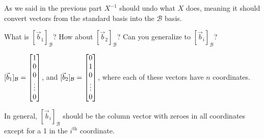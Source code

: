 \documentclass{workbook}
\begin{document}
\begin{slide}
\begin{parts}
\begin{solution}
				As we said in the previous part $X^{-1}$ should undo what $X$ does,
				meaning it should convert vectors from the standard basis into
				the $\mathcal B$ basis.
			\end{solution}
		\item What is $[\vec b_1]_{\mathcal B}$?  How about $[\vec b_2]_{\mathcal B}$?  Can
			you generalize to $[\vec b_i]_{\mathcal B}$?
			\begin{solution}
				$[\vec b_1]_{\mathcal B}=\begin{bmatrix}1\\0\\0\\\vdots\\0\end{bmatrix}$, and
				$[\vec b_2]_{\mathcal B}=\begin{bmatrix}0\\1\\0\\\vdots\\0\end{bmatrix}$, where each of
				these vectors have $n$ coordinates.

				In general, $[\vec b_i]_{\mathcal B}$ should be the column vector
				with zeroes in all coordinates except for a 1 in the $i^{\text{th}}$
				coordinate.
			\end{solution}
	\end{parts}
\end{slide}
\end{document}
